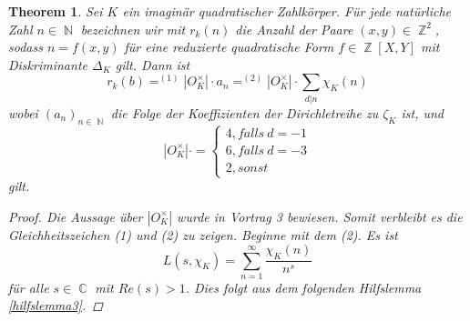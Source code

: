 \documentclass[10pt,a4paper]{article}
\theoremstyle{plain}
\newtheorem{thm}{Theorem}[section]
\theoremstyle{definition}
\theoremstyle{remark}
\DeclareMathOperator{\C}{\mathbb{C}}
\DeclareMathOperator{\Z}{\mathbb{Z}}
\DeclareMathOperator{\N}{\mathbb{N}}
\begin{document}
\begin{thm}

\textit{Sei $\textit{K}$ ein imaginär quadratischer Zahlkörper. Für jede natürliche Zahl $n \in \N$ bezeichnen wir mit $r_k(n)$ die Anzahl der Paare $(x,y) \in \Z^2$, sodass $n = f(x,y)$ für eine reduzierte quadratische Form $f \in \Z[X,Y]$ mit Diskriminante $\Delta_K$ gilt. Dann ist $$r_k(b) =^{(1)} |O_K^\times|\cdot a_n =^{(2)} |O_K^\times|\cdot \sum_{d|n}\chi_K(n)$$wobei $(a_n)_{n \in \N}$ die Folge der Koeffizienten der Dirichletreihe zu $\zeta_K$ ist, und $$|O_K^\times|\cdot =\begin{cases}4, falls \ d = -1\\6, falls \ d = -3\\2, sonst\end{cases}$$ gilt.}
\\
\begin{proof}
Die Aussage über $|O_K^\times|$ wurde in Vortrag 3 bewiesen. Somit verbleibt es die Gleichheitszeichen (1) und (2) zu zeigen. Beginne mit dem (2). Es ist $$L(s,\chi_K)=\sum_{n=1}^{\infty}\frac{\chi_K(n)}{n^s}$$ für alle $s \in \C$ mit $Re(s) > 1$. Dies folgt aus dem folgenden Hilfslemma \ref{hilfslemma3}.
 
 \end{proof}
 \end{thm}
 
\end{document}

